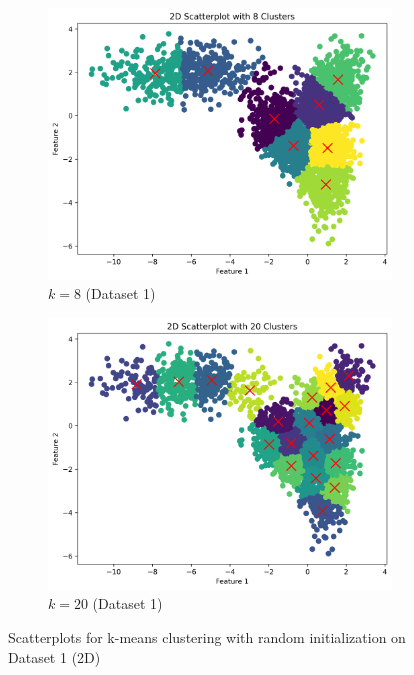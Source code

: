 \documentclass{article}
\begin{document}
\begin{figure}[h]
\begin{subfigure}[b]{0.45\textwidth}
        \includegraphics[width=\textwidth]{figures/random_2d_scatter_k8_d0.png}
        \caption{$k=8$ (Dataset 1)}
        \label{fig:2d_k8}
    \end{subfigure}
    \begin{subfigure}[b]{0.45\textwidth}
        \includegraphics[width=\textwidth]{figures/random_2d_scatter_k20_d0.png}
        \caption{$k=20$ (Dataset 1)}
        \label{fig:2d_k20}
    \end{subfigure}
    \caption{Scatterplots for k-means clustering with random initialization on Dataset 1 (2D)}
    \label{fig:2d_scatterplots}
\end{figure}
\end{document}
